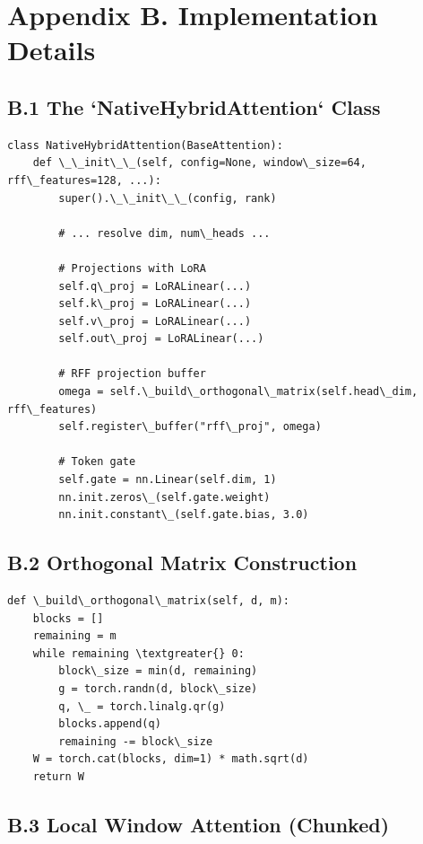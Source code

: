 
\section{Appendix B. Implementation Details}

\subsection{B.1 The `NativeHybridAttention` Class}

\begin{lstlisting}
class NativeHybridAttention(BaseAttention):
    def \_\_init\_\_(self, config=None, window\_size=64, rff\_features=128, ...):
        super().\_\_init\_\_(config, rank)
        
        # ... resolve dim, num\_heads ...
        
        # Projections with LoRA
        self.q\_proj = LoRALinear(...)
        self.k\_proj = LoRALinear(...)
        self.v\_proj = LoRALinear(...)
        self.out\_proj = LoRALinear(...)
        
        # RFF projection buffer
        omega = self.\_build\_orthogonal\_matrix(self.head\_dim, rff\_features)
        self.register\_buffer("rff\_proj", omega)
        
        # Token gate
        self.gate = nn.Linear(self.dim, 1)
        nn.init.zeros\_(self.gate.weight)
        nn.init.constant\_(self.gate.bias, 3.0)
\end{lstlisting}

\subsection{B.2 Orthogonal Matrix Construction}

\begin{lstlisting}
def \_build\_orthogonal\_matrix(self, d, m):
    blocks = []
    remaining = m
    while remaining \textgreater{} 0:
        block\_size = min(d, remaining)
        g = torch.randn(d, block\_size)
        q, \_ = torch.linalg.qr(g)
        blocks.append(q)
        remaining -= block\_size
    W = torch.cat(blocks, dim=1) * math.sqrt(d)
    return W
\end{lstlisting}

\subsection{B.3 Local Window Attention (Chunked)}

